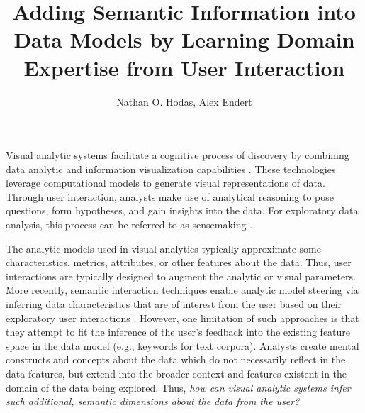 \documentclass[journal]{vgtc}
\title{Adding Semantic Information into Data Models by Learning Domain Expertise from User Interaction}
\author{Nathan O. Hodas, Alex Endert}
\newcommand{\remove}[1]{}
\begin{document}

\maketitle

Visual analytic systems facilitate a cognitive process of discovery by combining data analytic and information visualization capabilities \remove{\cite{thomas_illuminating_2005}}. These technologies leverage computational models to generate visual representations of data. Through user interaction, analysts make use of analytical reasoning to pose questions, form hypotheses, and gain insights into the data. For exploratory data analysis, this process can be referred to as sensemaking \cite{pirolli_sensemaking_2005}.

The analytic models used in visual analytics typically approximate some characteristics, metrics, attributes, or other features about the data. Thus, user interactions are typically designed to augment the analytic or visual parameters. More recently, semantic interaction techniques enable analytic model steering via inferring data characteristics that are of interest from the user based on their exploratory user interactions \cite{endert_beyond_2013}. However, one limitation of such approaches is that they attempt to fit the inference of the user's feedback into the existing feature space in the data model (e.g., keywords for text corpora). \remove{Prior work has shown that sensemaking and analytical reasoning of text corpora often entails users not only reasoning about the existing keywords in a corpora, but incorporating additional features and domain expertise into the dataset as part of their reasoning process \cite{endert_semantics_2012}\cite{andrews_space_2011}\cite{klein_making_2006}.} Analysts create mental constructs and concepts about the data which do not necessarily reflect in the data features, but extend into the broader context and features existent in the domain of the data being explored. \remove{This is important, as it is because of this ability for humans to impart their expertise that visual analytics strives for user feedback and the "human-in-the-loop" approach to data science. }
Thus, \textit{how can visual analytic systems infer such additional, semantic dimensions about the data from the user?}
\end{document}
